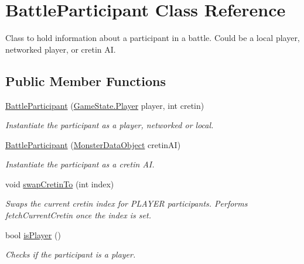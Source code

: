 \hypertarget{class_battle_participant}{\section{Battle\-Participant Class Reference}
\label{class_battle_participant}
}


Class to hold information about a participant in a battle. Could be a local player, networked player, or cretin A\-I.  


\subsection*{Public Member Functions}
\begin{DoxyCompactItemize}
\item 
\hyperlink{class_battle_participant_aa08199f7a1456a22690a8a4b61da5089}{Battle\-Participant} (\hyperlink{class_game_state_1_1_player}{Game\-State.\-Player} player, int cretin)
\begin{DoxyCompactList}\small\item\em Instantiate the participant as a player, networked or local. \end{DoxyCompactList}\item 
\hyperlink{class_battle_participant_a636ea63e4b3f972767322e56aa5f3088}{Battle\-Participant} (\hyperlink{class_monster_data_object}{Monster\-Data\-Object} cretin\-A\-I)
\begin{DoxyCompactList}\small\item\em Instantiate the participant as a cretin A\-I. \end{DoxyCompactList}\item 
void \hyperlink{class_battle_participant_a32c2449a4bf42f88a7abd2ac5639add2}{swap\-Cretin\-To} (int index)
\begin{DoxyCompactList}\small\item\em Swaps the current cretin index for P\-L\-A\-Y\-E\-R participants. Performs fetch\-Current\-Cretin once the index is set. \end{DoxyCompactList}\item 
bool \hyperlink{class_battle_participant_a772329be78feaa3c85a692c39dc54a47}{is\-Player} ()
\begin{DoxyCompactList}\small\item\em Checks if the participant is a player. \end{DoxyCompactList}\end{DoxyCompactItemize}
